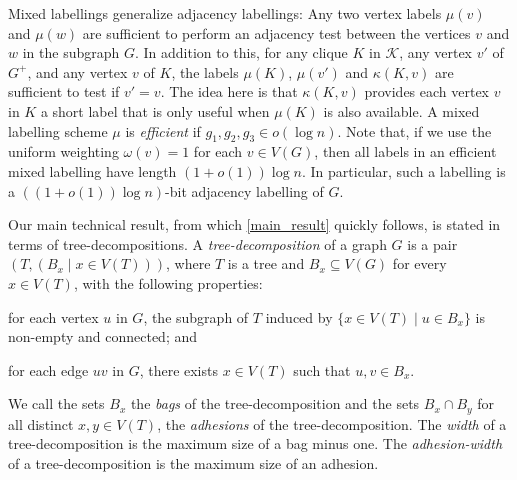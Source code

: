 \documentclass{patmorin}
\newcommand{\defin}[1]{\emph{\textcolor{brightmaroon}{#1}}}
\newcommand{\calK}{\mathcal{K}}
\begin{document}
Mixed labellings generalize adjacency labellings: Any two vertex labels $\mu(v)$ and $\mu(w)$ are sufficient to perform an adjacency test between the vertices $v$ and $w$ in the subgraph $G$.  In addition to this, for any clique $K$ in $\calK$, any vertex $v'$ of $G^+$, and any vertex $v$ of $K$, the labels $\mu(K)$, $\mu(v')$ and $\kappa(K,v)$ are sufficient to test if $v'=v$.  The idea here is that $\kappa(K,v)$ provides each vertex $v$ in $K$ a short label that is only useful when $\mu(K)$ is also available.   A mixed labelling scheme $\mu$ is \defin{efficient} if $g_1,g_2,g_3\in o(\log n)$.  Note that, if we use the uniform weighting $\omega(v)=1$ for each $v\in V(G)$, then all labels in an efficient mixed labelling have length $(1+o(1))\log n$.  In particular, such a labelling is a $((1+o(1))\log n)$-bit adjacency labelling of $G$.

Our main technical result, from which \cref{main_result} quickly follows, is stated in terms of tree-decompositions.  A \defin{tree-decomposition} of a graph $G$ is a pair $(T,(B_x \mid x \in V(T)))$,
where $T$ is a tree and $B_x \subseteq V(G)$ for every $x \in V(T)$, with the
following properties:
\begin{enumerate*}[label=(\alph*)]
	\item for each vertex $u$ in $G$, the subgraph of $T$ induced by $\{x \in V(T) \mid u \in B_x\}$ is non-empty and connected; and
	\item for each edge $uv$ in $G$, there exists $x\in V(T)$ such that $u,v\in B_x$.
\end{enumerate*}
We call the sets $B_x$ the \defin{bags} of the tree-decomposition and the sets $B_x\cap B_y$ for all distinct $x,y\in V(T)$, the \defin{adhesions} of the tree-decomposition.
The \defin{width} of a tree-decomposition is the maximum size of a bag minus one.
The \defin{adhesion-width} of a tree-decomposition is the maximum size of an adhesion.
\end{document}
